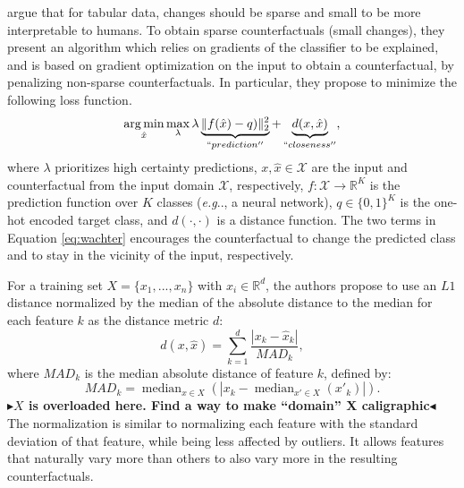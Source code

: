 \documentclass[11pt,a4paper,twoside,openright,final]{memoir}
\makeatletter
\DeclareMathOperator*{\argmin}{\arg\min}
\def\ifdraft{\ifdim\overfullrule>\z@
  \expandafter\@firstoftwo\else\expandafter\@secondoftwo\fi}
\newcommand{\todo}[1]{{
    \ifdraft{
        \color[rgb]{.5,0,0}\textbf{
            $\blacktriangleright$#1$\blacktriangleleft$
         }
    }{}}}
\DeclareRobustCommand\onedot{\futurelet\@let@token\@onedot}
\def\@onedot{\ifx\@let@token.\else.\null\fi\xspace}
\def\eg{\emph{e.g}\onedot} \def\Eg{\emph{E.g}\onedot}
\makeatother
\begin{document}
\citet{Wachter2017} argue that for tabular data, changes should be sparse and small to be more interpretable to humans.
To obtain sparse counterfactuals (small changes), they present an algorithm which relies on gradients of the classifier to be explained, and is based on gradient optimization on the input to obtain a counterfactual, by penalizing non-sparse counterfactuals.
In particular, they propose to  minimize the following loss function.
\begin{equation}\label{eq:wachter}
    \argmin_{\hat x} \max_\lambda 
    \lambda \underbrace{\|f(\hat x) - q)\|_2^2 }_{``prediction''}
    +       \underbrace{d(x, \hat x)}_{``closeness''},
\end{equation}
where $\lambda$ prioritizes high certainty predictions, $x, \hat x \in \mathcal{X}$ are the input and counterfactual from the input domain $\mathcal{X}$, respectively, $f: \mathcal{X} \rightarrow \mathbb{R}^K$ is the prediction function over $K$ classes (\eg, a neural network), $q\in \{0, 1\}^K$ is the one-hot encoded target class, and $d(\cdot, \cdot)$ is a distance function.
The two terms in Equation \eqref{eq:wachter} encourages the counterfactual to change the predicted class and to stay in the vicinity of the input, respectively.

For a training set $X = \{ x_1, ..., x_n  \}$ with $x_i \in \mathbb{R}^d$, the authors propose to use an $L1$ distance normalized by the median of the absolute distance to the median for each feature $k$ as the distance metric $d$:
\begin{equation}
    d(x, \hat x) = \sum_{k=1}^d \frac{|x_k - \hat x_k|}{MAD_k}, 
\end{equation}
where $MAD_k$ is the median absolute distance of feature $k$, defined by:
\begin{equation}\label{eq:MAD}
    MAD_k = \operatorname{median}_{x\in X} (|x_k - \operatorname{median}_{x'\in X}(x'_k)|).
\end{equation}
\todo{$X$ is overloaded here. Find a way to make ``domain'' X caligraphic}
The normalization is similar to normalizing each feature with the standard deviation of that feature, while being less affected by outliers. 
It allows features that naturally vary more than others to also vary more in the resulting counterfactuals. 
\end{document}
